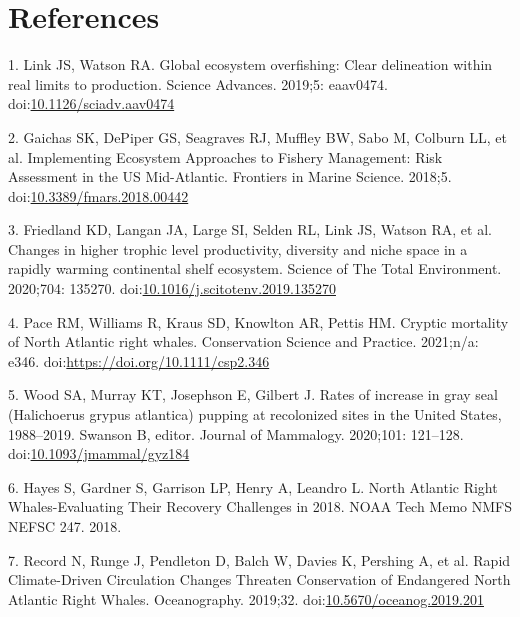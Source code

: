 \documentclass[
  10pt,
]{article}
\begin{document}
\newpage

\hypertarget{references}{%
\section*{References}\label{references}}

\hypertarget{refs}{}
\leavevmode\hypertarget{ref-link_global_2019}{}%
1. Link JS, Watson RA. Global ecosystem overfishing: Clear delineation
within real limits to production. Science Advances. 2019;5: eaav0474.
doi:\href{https://doi.org/10.1126/sciadv.aav0474}{10.1126/sciadv.aav0474}

\leavevmode\hypertarget{ref-gaichas_implementing_2018}{}%
2. Gaichas SK, DePiper GS, Seagraves RJ, Muffley BW, Sabo M, Colburn LL,
et al. Implementing Ecosystem Approaches to Fishery Management: Risk
Assessment in the US Mid-Atlantic. Frontiers in Marine Science. 2018;5.
doi:\href{https://doi.org/10.3389/fmars.2018.00442}{10.3389/fmars.2018.00442}

\leavevmode\hypertarget{ref-friedland_changes_2020}{}%
3. Friedland KD, Langan JA, Large SI, Selden RL, Link JS, Watson RA, et
al. Changes in higher trophic level productivity, diversity and niche
space in a rapidly warming continental shelf ecosystem. Science of The
Total Environment. 2020;704: 135270.
doi:\href{https://doi.org/10.1016/j.scitotenv.2019.135270}{10.1016/j.scitotenv.2019.135270}

\leavevmode\hypertarget{ref-pace_cryptic_2021}{}%
4. Pace RM, Williams R, Kraus SD, Knowlton AR, Pettis HM. Cryptic
mortality of North Atlantic right whales. Conservation Science and
Practice. 2021;n/a: e346.
doi:\href{https://doi.org/https://doi.org/10.1111/csp2.346}{https://doi.org/10.1111/csp2.346}

\leavevmode\hypertarget{ref-wood_rates_2020}{}%
5. Wood SA, Murray KT, Josephson E, Gilbert J. Rates of increase in gray
seal (Halichoerus grypus atlantica) pupping at recolonized sites in the
United States, 1988--2019. Swanson B, editor. Journal of Mammalogy.
2020;101: 121--128.
doi:\href{https://doi.org/10.1093/jmammal/gyz184}{10.1093/jmammal/gyz184}

\leavevmode\hypertarget{ref-hayes_north_2018}{}%
6. Hayes S, Gardner S, Garrison LP, Henry A, Leandro L. North Atlantic
Right Whales-Evaluating Their Recovery Challenges in 2018. NOAA Tech
Memo NMFS NEFSC 247. 2018.

\leavevmode\hypertarget{ref-record_rapid_2019}{}%
7. Record N, Runge J, Pendleton D, Balch W, Davies K, Pershing A, et al.
Rapid Climate-Driven Circulation Changes Threaten Conservation of
Endangered North Atlantic Right Whales. Oceanography. 2019;32.
doi:\href{https://doi.org/10.5670/oceanog.2019.201}{10.5670/oceanog.2019.201}
\end{document}
